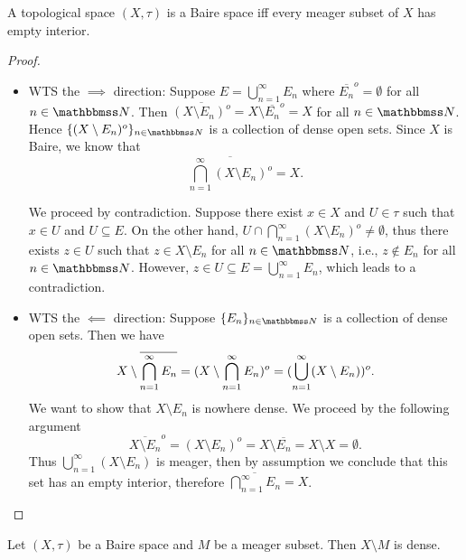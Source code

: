 \documentclass[screen,single]{techreport}
\numberwithin{equation}{section}
\begin{document}
\begin{proposition}\label{Prop:BaireIffMeagerSetHasEmptyInt}
  A topological space $(X,\tau)$ is a Baire space iff every meager subset of $X$ has empty interior.
\end{proposition}
\begin{proof}\
  \begin{itemize}
    \item WTS the $\implies$ direction: Suppose $E = \bigcup_{n=1}^\infty E_n$ where $\overline{E_n}^o = \emptyset$ for all $n \in \bbN$.
    Then $\overline{(X \setminus E_n)^o} = X \setminus \overline{E_n}^o = X$ for all $n \in \bbN$.
    Hence $\{ (X \setminus E_n)^o\}_{n \in \bbN}$ is a collection of dense open sets.
    Since $X$ is Baire, we know that
    \[
    \overline{\bigcap_{n=1}^\infty (X \setminus E_n)^o }= X.
    \]
    
    We proceed by contradiction. Suppose there exist $x \in X$ and $U \in \tau$ such that $x \in U$ and $U \subseteq E$.
    On the other hand, $U \cap \bigcap_{n=1}^\infty (X \setminus E_n)^o \neq \emptyset$, thus there exists $z \in U$ such that $z \in X \setminus E_n$ for all $n \in \bbN$, i.e., $z \not\in E_n$ for all $n \in \bbN$.
    However, $z \in U \subseteq E = \bigcup_{n=1}^\infty E_n$, which leads to a contradiction.
    
    \item WTS the $\impliedby$ direction: Suppose $\{E_n\}_{n \in \bbN}$ is a collection of dense open sets.
    Then we have
    \[
    X \setminus \overline{\bigcap_{n=1}^\infty E_n} = ({X \setminus \bigcap_{n=1}^\infty E_n})^o = ({ \bigcup_{n=1}^\infty (X \setminus E_n)})^o.
    \]
    We want to show that $X \setminus E_n$ is nowhere dense.
    We proceed by the following argument
    \[
    \overline{X \setminus E_n}^o = (X \setminus E_n)^o = X \setminus \overline{E_n} = X \setminus X = \emptyset.
    \]
    Thus $\bigcup_{n=1}^\infty (X \setminus E_n)$ is meager, then by assumption we conclude that this set has an empty interior, therefore $\overline{\bigcap_{n=1}^\infty E_n} = X$.
  \end{itemize}
\end{proof}

\begin{corollary}\label{Cor:BaireImplyComplementOfMeagerIsDense}
  Let $(X,\tau)$ be a Baire space and $M$ be a meager subset.
  Then $X \setminus M$ is dense.
\end{corollary}
\end{document}
